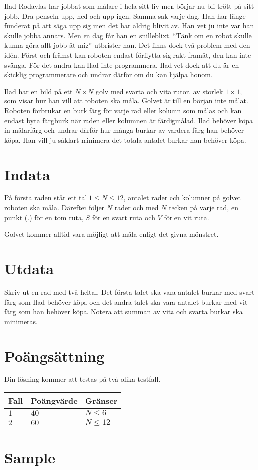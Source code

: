 
Ilad Rodavlas har jobbat som målare i hela sitt liv men börjar nu bli trött på sitt jobb. Dra penseln upp, ned och upp igen. Samma sak varje dag. Han har länge funderat på att säga upp sig men det har aldrig blivit av. Han vet ju inte var han skulle jobba annars. Men en dag får han en snilleblixt. “Tänk om en robot skulle kunna göra allt jobb åt mig” utbrister han. Det finns dock två problem med den  idén. Först och främst kan roboten endast förflytta sig rakt framåt, den kan inte svänga. För det andra kan Ilad inte programmera. Ilad vet dock att du är en skicklig programmerare och undrar därför om du kan hjälpa honom. 

Ilad har en bild på ett $N \times N$ golv med svarta och vita rutor, av storlek $1 \times 1$, som visar hur han vill att roboten ska måla. Golvet är till en början inte målat. Roboten förbrukar en burk färg för varje rad eller kolumn som målas och kan endast byta färgburk när raden eller kolumnen är färdigmålad. Ilad behöver köpa in målarfärg och undrar därför hur många burkar av vardera färg han behöver köpa. Han vill ju såklart minimera det totala antalet burkar han behöver köpa. 

\section*{Indata}

På första raden står ett tal $1 \leq N \leq 12$, antalet rader och kolumner på golvet roboten ska måla. Därefter följer $N$ rader och med $N$ tecken på varje rad, en punkt ($.$) för en tom ruta, $S$ för en svart ruta och $V$ för en vit ruta.

Golvet kommer alltid vara möjligt att måla enligt det givna mönstret. 

\section*{Utdata}

Skriv ut en rad med två heltal. Det första talet ska vara antalet burkar med svart färg som Ilad behöver köpa och det andra talet ska vara antalet burkar med vit färg som han behöver köpa. Notera att summan av vita och svarta burkar ska minimeras. 

\section*{Poängsättning}

Din lösning kommer att testas på två olika testfall.

\noindent
\begin{tabular}{| l | l | l |}
  \hline
  Fall & Poängvärde & Gränser \\ \hline
  $1$    & $40$    &  $N \leq 6$  \\ \hline 
  $2$    & $60$    &  $N \leq 12$  \\ \hline 
\end{tabular}

\section*{Sample}